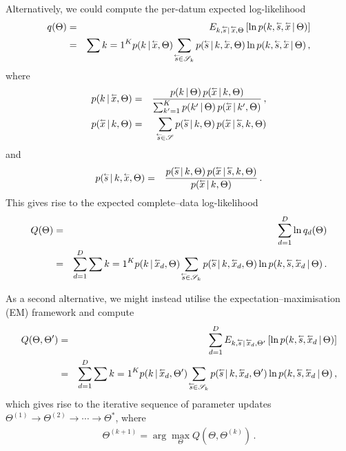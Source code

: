 \documentclass[a4paper]{article}
\newcommand{\rvec}[1]{\accentset{\leftarrow}{#1}}
\begin{document}
Alternatively, we could compute the per-datum expected log-likelihood
\begin{eqnarray}
q(\Theta) & = & E_{k,\rvec{s}\,|\,\rvec{x},\Theta}\left[\ln
p(k,\rvec{s},\rvec{x}\,|\,\Theta)\right]
\nonumber\\
& = & \sum{k=1}^K p(k\,|\,\rvec{x},\Theta)
\sum_{\rvec{s}\in\mathscr{S}_k} p(\rvec{s}\,|\,k,\rvec{x},\Theta)
\ln p(k,\rvec{s},\rvec{x}\,|\,\Theta)
\,,
\end{eqnarray}
where
\begin{eqnarray}
p(k\,|\,\rvec{x},\Theta) & = & 
\frac{p(k\,|\,\Theta)\,p(\rvec{x}\,|\,k,\Theta)}
{\sum_{k'=1}^K p(k'\,|\,\Theta)\,p(\rvec{x}\,|\,k',\Theta)}\,,
\\
p(\rvec{x}\,|\,k,\Theta) & = & \sum_{\rvec{s}\in\mathscr{S}}
p(\rvec{s}\,|\,k,\Theta)\,p(\rvec{x}\,|\,\rvec{s},k,\Theta)
\end{eqnarray}
and
\begin{eqnarray}
p(\rvec{s}\,|\,k,\rvec{x},\Theta) & = & 
\frac{p(\rvec{s}\,|\,k,\Theta)\,p(\rvec{x}\,|\,\rvec{s},k,\Theta)}
{p(\rvec{x}\,|\,k,\Theta)}\,.
\end{eqnarray}
This gives rise to the expected complete--data log-likelihood
\begin{eqnarray}
Q(\Theta) & = & \sum_{d=1}^D \ln q_d(\Theta)
\nonumber\\
& = & \sum_{d=1}^D\sum{k=1}^K p(k\,|\,\rvec{x}_d,\Theta)
\sum_{\rvec{s}\in\mathscr{S}_k} p(\rvec{s}\,|\,k,\rvec{x}_d,\Theta)
\ln p(k,\rvec{s},\rvec{x}_d\,|\,\Theta)
\,.
\end{eqnarray}

As a second alternative, we might instead utilise the expectation--maximisation
(EM) framework and compute
\begin{eqnarray}
Q(\Theta,\Theta') & = & \sum_{d=1}^D
E_{k,\rvec{s}\,|\,\rvec{x}_d,\Theta'}\left[\ln
p(k,\rvec{s},\rvec{x}_d\,|\,\Theta)\right] \nonumber\\
& = & \sum_{d=1}^D\sum{k=1}^K p(k\,|\,\rvec{x}_d,\Theta')
\sum_{\rvec{s}\in\mathscr{S}_k} p(\rvec{s}\,|\,k,\rvec{x}_d,\Theta')
\ln p(k,\rvec{s},\rvec{x}_d\,|\,\Theta)
\,,
\end{eqnarray}
which gives rise to the iterative sequence of parameter updates
$\Theta^{(1)}\rightarrow\Theta^{(2)}\rightarrow\cdots\rightarrow\Theta^*$,
where
\begin{eqnarray}
\Theta^{(k+1)} = \arg\max_{\Theta} Q(\Theta,\Theta^{(k)})\,.
\end{eqnarray}
\end{document}
